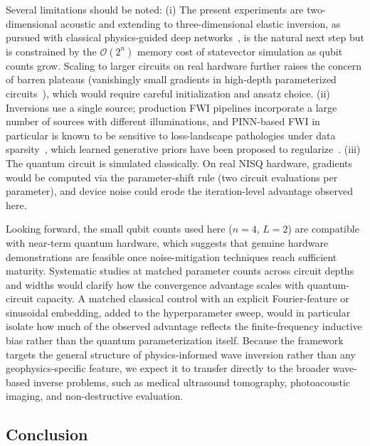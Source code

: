 Several limitations should be noted: (i) The present experiments are two-dimensional acoustic and extending to three-dimensional elastic inversion, as pursued with classical physics-guided deep networks~\cite{10178066}, is the natural next step but is constrained by the $\mathcal{O}(2^n)$ memory cost of statevector simulation as qubit counts grow. Scaling to larger circuits on real hardware further raises the concern of barren plateaus (vanishingly small gradients in high-depth parameterized circuits~\cite{mcclean2018barren}), which would require careful initialization and ansatz choice. (ii) Inversions use a single source; production FWI pipelines incorporate a large number of sources with different illuminations, and PINN-based FWI in particular is known to be sensitive to loss-landscape pathologies under data sparsity~\cite{krishnapriyan2021failure}, which learned generative priors have been proposed to regularize~\cite{Wang2023diff}. (iii) The quantum circuit is simulated classically. On real NISQ hardware, gradients would be computed via the parameter-shift rule (two circuit evaluations per parameter), and device noise could erode the iteration-level advantage observed here.

Looking forward, the small qubit counts used here ($n=4$, $L=2$) are compatible with near-term quantum hardware, which suggests that genuine hardware demonstrations are feasible once noise-mitigation techniques reach sufficient maturity. Systematic studies at matched parameter counts across circuit depths and widths would clarify how the convergence advantage scales with quantum-circuit capacity. A matched classical control with an explicit Fourier-feature or sinusoidal embedding, added to the hyperparameter sweep, would in particular isolate how much of the observed advantage reflects the finite-frequency inductive bias rather than the quantum parameterization itself. Because the framework targets the general structure of physics-informed wave inversion rather than any geophysics-specific feature, we expect it to transfer directly to the broader wave-based inverse problems, such as medical ultrasound tomography, photoacoustic imaging, and non-destructive evaluation.

\subsection{Conclusion}

